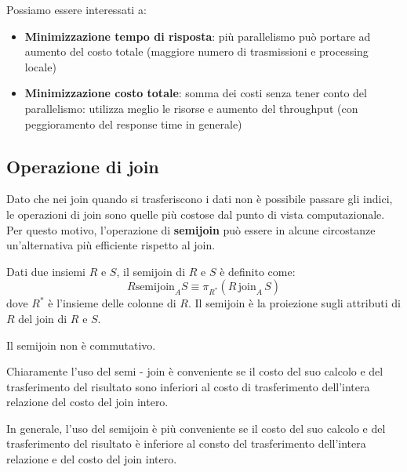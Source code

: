 Possiamo essere interessati a:
\begin{itemize}
      \item \textbf{Minimizzazione tempo di risposta}: più parallelismo può portare ad
            aumento del costo totale (maggiore numero di trasmissioni e
            processing locale)
      \item \textbf{Minimizzazione costo totale}: somma dei costi senza tener conto del
            parallelismo: utilizza meglio le risorse e aumento del throughput (con
            peggioramento del response time in generale)
\end{itemize}
\subsection{Operazione di join}
Dato che nei join quando si trasferiscono i dati non è possibile passare gli indici,
le operazioni di join sono quelle più costose dal punto di vista computazionale.
Per questo motivo, l'operazione di \textbf{semijoin} può essere in alcune circostanze
un'alternativa più efficiente rispetto al join.
\begin{definizione}
      Dati due insiemi $R$ e $S$, il semijoin di $R$ e $S$ è definito come:
      \begin{equation*}
            R \text{semijoin}_A S \equiv \pi_{R^\ast}(R \, \text{join}_A \, S)
      \end{equation*}
      dove $R^\ast$ è l'insieme delle colonne di $R$. Il semijoin è la proiezione
      sugli attributi di $R$ del join di $R$ e $S$.
\end{definizione}
\begin{nota}
      Il semijoin non è commutativo.
\end{nota}
Chiaramente l'uso del semi - join è conveniente se il costo del suo calcolo e
del trasferimento del risultato sono inferiori al costo di trasferimento
dell'intera relazione del costo del join intero.

In generale, l'uso del semijoin è più conveniente se il costo del suo calcolo e
del trasferimento del risultato è inferiore al consto del trasferimento
dell'intera relazione e del costo del join intero.
